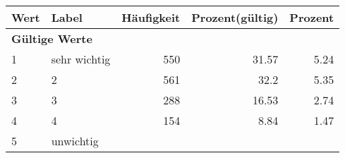      \begin{longtable}{lXrrr}
     \toprule
     \textbf{Wert} & \textbf{Label} & \textbf{Häufigkeit} & \textbf{Prozent(gültig)} & \textbf{Prozent} \\
     \endhead
     \midrule
     \multicolumn{5}{l}{\textbf{Gültige Werte}}\\

     1 &
     \multicolumn{1}{X}{ sehr wichtig   } &


       \num{550} &
       \num[round-mode=places,round-precision=2]{31.57} &
         \num[round-mode=places,round-precision=2]{5.24} \\

     2 &
     \multicolumn{1}{X}{ 2   } &


       \num{561} &
       \num[round-mode=places,round-precision=2]{32.2} &
         \num[round-mode=places,round-precision=2]{5.35} \\

     3 &
     \multicolumn{1}{X}{ 3   } &


       \num{288} &
       \num[round-mode=places,round-precision=2]{16.53} &
         \num[round-mode=places,round-precision=2]{2.74} \\

     4 &
     \multicolumn{1}{X}{ 4   } &


       \num{154} &
       \num[round-mode=places,round-precision=2]{8.84} &
         \num[round-mode=places,round-precision=2]{1.47} \\

     5 &
     \multicolumn{1}{X}{ unwichtig   } &



\end{longtable}
